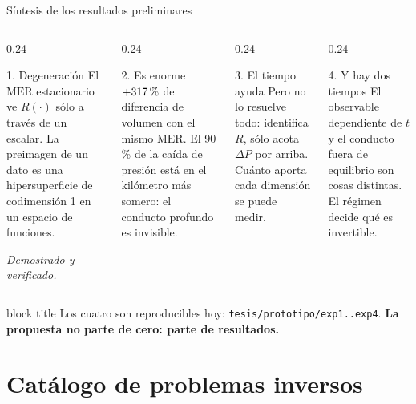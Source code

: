 \documentclass[aspectratio=169,10pt,t]{beamer}
\newcommand{\pc}{\ifmmode\text{\,\%}\else\,\%\fi}
\newcommand{\MER}{\mathrm{MER}}
\newcommand{\mensaje}[1]{%
  \vfill
  \begin{beamercolorbox}[wd=\linewidth,sep=0.4em,rounded=true]{block title}
  \footnotesize #1
  \end{beamercolorbox}}
\begin{document}
\begin{frame}{Síntesis de los resultados preliminares}
\begin{columns}[T]
\begin{column}{0.24\textwidth}
\begin{block}{1. Degeneración}
\footnotesize El $\MER$ estacionario ve $R(\cdot)$ sólo a través de \alert{un
escalar}. La preimagen de un dato es una hipersuperficie de codimensión 1 en un
espacio de funciones.\smallskip

\emph{Demostrado y verificado.}
\end{block}
\end{column}
\begin{column}{0.24\textwidth}
\begin{block}{2. Es enorme}
\footnotesize $+317\pc$ de diferencia de volumen con el mismo $\MER$. El 90 \%
de la caída de presión está en el kilómetro más somero: \alert{el conducto
profundo es invisible}.
\end{block}
\end{column}
\begin{column}{0.24\textwidth}
\begin{block}{3. El tiempo ayuda}
\footnotesize Pero no lo resuelve todo: identifica $R$, sólo acota $\Delta P$
por arriba. \alert{Cuánto aporta cada dimensión se puede medir.}
\end{block}
\end{column}
\begin{column}{0.24\textwidth}
\begin{block}{4. Y hay dos tiempos}
\footnotesize El observable dependiente de $t$ y el conducto fuera de
equilibrio son cosas distintas. \alert{El régimen decide qué es invertible.}
\end{block}
\end{column}
\end{columns}

\vspace{1.2em}
\mensaje{Los cuatro son reproducibles hoy: \texttt{tesis/prototipo/exp1..exp4}.
\textbf{La propuesta no parte de cero: parte de resultados.}}
\end{frame}

\section{Catálogo de problemas inversos}
\end{document}
